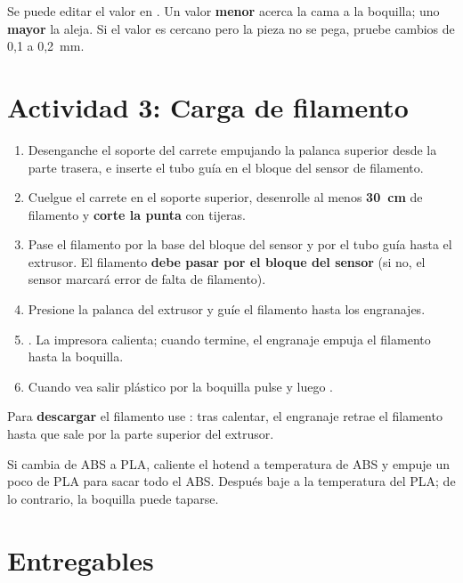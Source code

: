 \begin{infobox}
Se puede editar el valor en \flecha{}\flecha{}\flecha{}. Un valor \textbf{menor} acerca la cama a la boquilla; uno \textbf{mayor} la aleja. Si el valor es cercano pero la pieza no se pega, pruebe cambios de 0,1 a 0,2~mm.
\end{infobox}

\newpage
\section{Actividad 3: Carga de filamento}

\begin{enumerate}
    \item Desenganche el soporte del carrete empujando la palanca superior desde la parte trasera, e inserte el tubo guía en el bloque del sensor de filamento.
    \item Cuelgue el carrete en el soporte superior, desenrolle al menos \textbf{30~cm} de filamento y \textbf{corte la punta} con tijeras.
    \item Pase el filamento por la base del bloque del sensor y por el tubo guía hasta el extrusor. El filamento \textbf{debe pasar por el bloque del sensor} (si no, el sensor marcará error de falta de filamento).
    \item Presione la palanca del extrusor y guíe el filamento hasta los engranajes.
    \item {}\flecha{}\flecha{}. La impresora calienta; cuando termine, el engranaje empuja el filamento hasta la boquilla.
    \item Cuando vea salir plástico por la boquilla pulse  y luego .
\end{enumerate}

Para \textbf{descargar} el filamento use \flecha{}\flecha{}: tras calentar, el engranaje retrae el filamento hasta que sale por la parte superior del extrusor.

\begin{infobox}
Si cambia de ABS a PLA, caliente el hotend a temperatura de ABS y empuje un poco de PLA para sacar todo el ABS. Después baje a la temperatura del PLA; de lo contrario, la boquilla puede taparse.
\end{infobox}

\section{Entregables}

